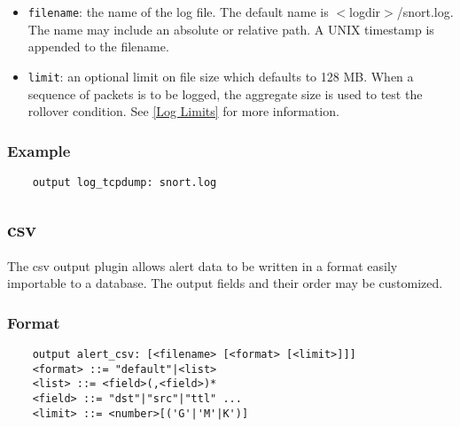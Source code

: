 \documentclass[english]{report}
\begin{document}
\begin{itemize}
\item \texttt{filename}: the name of the log file.  The default name is
$<$logdir$>$/snort.log.  The name may include an absolute or relative path.  A
UNIX timestamp is appended to the filename.

\item \texttt{limit}: an optional limit on file size which defaults to 128 MB.
When a sequence of packets is to be logged, the aggregate size is used to test
the rollover condition.  See \ref{Log Limits} for more information.
\end{itemize}

\subsubsection{Example}

\begin{verbatim}
    output log_tcpdump: snort.log
\end{verbatim}

\subsection{csv}

The csv output plugin allows alert data to be written in a format easily
importable to a database.  The output fields and their order may be customized.

\subsubsection{Format}

\begin{verbatim}
    output alert_csv: [<filename> [<format> [<limit>]]]
    <format> ::= "default"|<list>
    <list> ::= <field>(,<field>)*
    <field> ::= "dst"|"src"|"ttl" ...
    <limit> ::= <number>[('G'|'M'|K')]
\end{verbatim}
\end{document}
